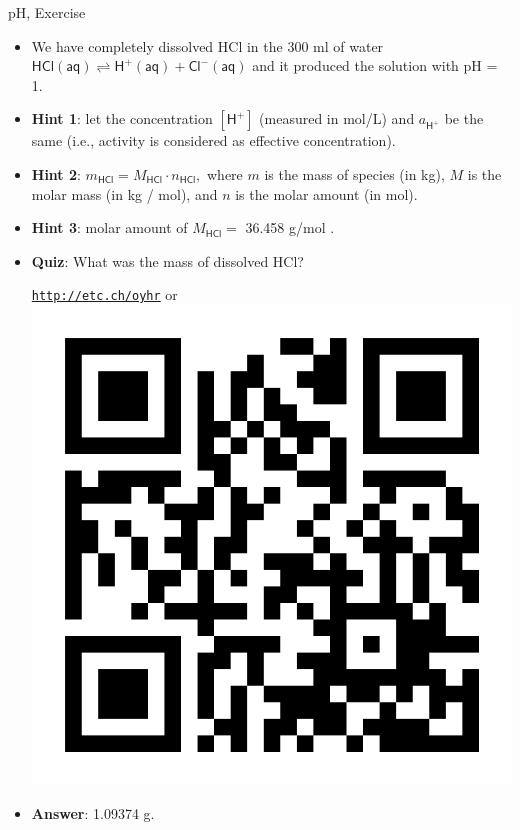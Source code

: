 \begin{frame}{pH, Exercise}
	\small
	\begin{itemize}
		\item We have completely dissolved HCl in the 300 ml of water  
		$\mathsf{HCl(aq) \rightleftharpoons H^+(aq) + Cl^-(aq)}$
		 and it produced the solution with pH = 1. 
		\pause
		\item {\bf Hint 1}: let the concentration $[\mathsf{H^+}]$ (measured in mol/L) and $a_{\mathsf{H^+}}$ be the same (i.e., activity is considered as effective concentration). 
		\item {\bf Hint 2}: $m_{\mathsf{HCl}} = M_{\mathsf{HCl}}  \cdot n_{\mathsf{HCl}},$ 
		where $m$ is the mass of species (in kg), 
		$M$ is the molar mass (in kg / mol), and 
		$n$ is the molar amount (in mol). 
		\item {\bf Hint 3}: molar amount of $M_{\mathsf{HCl}} = $ 36.458 g/mol .
		\pause
		\item  \alert{\bf Quiz}: What was the mass of dissolved HCl?
		\begin{center}
			\href{http://etc.ch/oyhr}{\textcolor{indigo(dye)}{\tt http://etc.ch/oyhr}} 
			\quad
			or 
			\quad
			\includegraphics[height=0.2\columnwidth]{figures/chemical-equilibrium/poll.png}
		\end{center}
		\hiddenpause
		\item {\bf Answer}: 1.09374 g. 
	\end{itemize}
	
\end{frame}
%
